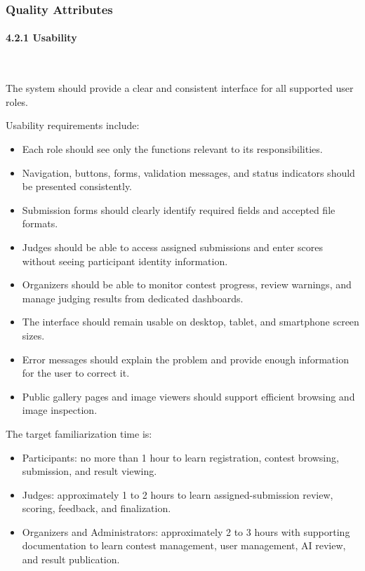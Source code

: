 \subsubsection{Quality Attributes}
\label{subsubsec:quality-attributes}

\paragraph*{4.2.1 Usability}\leavevmode\\[-0.5em]
\label{par:usability}

The system should provide a clear and consistent interface for all supported user roles.

Usability requirements include:

\begin{itemize}[leftmargin=1.5em, nosep]
    \item Each role should see only the functions relevant to its responsibilities.
    \item Navigation, buttons, forms, validation messages, and status indicators should be presented consistently.
    \item Submission forms should clearly identify required fields and accepted file formats.
    \item Judges should be able to access assigned submissions and enter scores without seeing participant identity information.
    \item Organizers should be able to monitor contest progress, review warnings, and manage judging results from dedicated dashboards.
    \item The interface should remain usable on desktop, tablet, and smartphone screen sizes.
    \item Error messages should explain the problem and provide enough information for the user to correct it.
    \item Public gallery pages and image viewers should support efficient browsing and image inspection.
\end{itemize}

The target familiarization time is:

\begin{itemize}[leftmargin=1.5em, nosep]
    \item Participants: no more than 1 hour to learn registration, contest browsing, submission, and result viewing.
    \item Judges: approximately 1 to 2 hours to learn assigned-submission review, scoring, feedback, and finalization.
    \item Organizers and Administrators: approximately 2 to 3 hours with supporting documentation to learn contest management, user management, AI review, and result publication.
\end{itemize}

